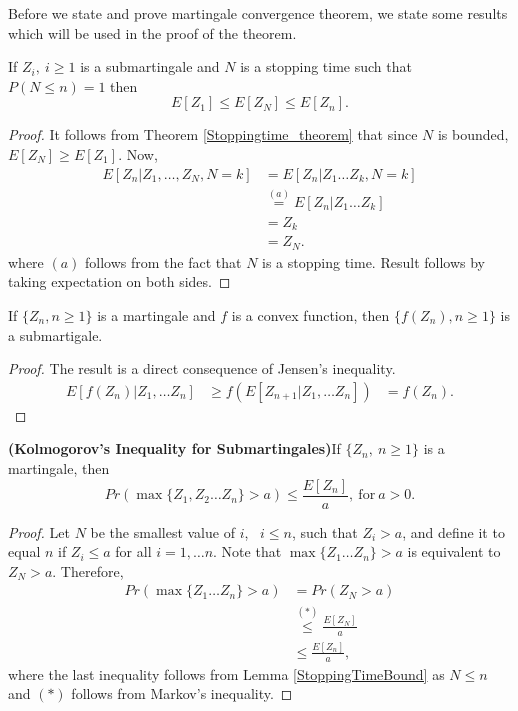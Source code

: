 \documentclass[a4paper,10pt,english]{article}
\begin{document}
Before we state and prove martingale convergence theorem, we state some results which will be used in the proof of the theorem.
\begin{lem}
\label{StoppingTimeBound}
If ${Z_i,~i\geq 1}$ is  a submartingale and $N$ is a stopping time such that $P(N \leq n)=1$ then
\begin{equation*}
 E[Z_1] \leq E[Z_N] \leq E[Z_n].
\end{equation*}
\end{lem}
\begin{proof}
It follows from Theorem \ref{Stoppingtime_theorem} that since $N$ is bounded, $E[Z_N] \geq E[Z_1]$. Now, 
\begin{eqnarray*}
E[Z_n|Z_1, \hdots ,Z_N,N=k]&=E[Z_n|Z_1 \hdots Z_k,N=k]\\
&\stackrel{(a)}{=}E[Z_n|Z_1 \hdots Z_k]\\
&=Z_k\\
&=Z_N.
\end{eqnarray*}
where $(a)$ follows from the fact that $N$ is  a stopping time. Result follows by taking expectation on both sides.
\end{proof}
\begin{lem}
\label{ConvexFuncSubmart}
If $\{Z_n,n \geq 1\}$ is a martingale and $f$ is a convex function, then $\{f(Z_n),n \geq 1\}$ is a submartigale.
\end{lem}
\begin{proof}
The result is a direct consequence of Jensen's inequality.
\begin{eqnarray*}
E[f(Z_n)|Z_1, \hdots Z_n] &\geq f(E[Z_{n+1}|Z_1, \hdots Z_n])
&=f(Z_n).
\end{eqnarray*}
\end{proof}
\begin{thm}
\textbf{(Kolmogorov's Inequality for Submartingales)}If $\{Z_n,~ n \geq 1\}$ is a martingale, then
\begin{equation*}
Pr(\max\{Z_1,Z_2 \hdots Z_n\}>a)\leq \frac{E[Z_n]}{a},~ \text{for}~ a>0.
\end{equation*}
\end{thm}
\begin{proof}
Let $N$ be the smallest value of $i$,~ $i \leq n$, such that $Z_i >a$, and define it to equal $n$ if $Z_i \leq a$ for all $i=1, \hdots n$. Note that $\max\{Z_1 \hdots Z_n\}>a$ is equivalent to $Z_N>a$. Therefore,
\begin{eqnarray*}
Pr(\max\{Z_1 \hdots Z_n\}>a)&=Pr(Z_N>a)\\
&\stackrel{(*)}{\leq} \frac{E[Z_N]}{a}\\
&\leq  \frac{E[Z_n]}{a},
\end{eqnarray*}
where the last inequality follows from Lemma \ref{StoppingTimeBound} as $N \leq n$ and $(*)$ follows from Markov's inequality.
\end{proof}
\end{document}
